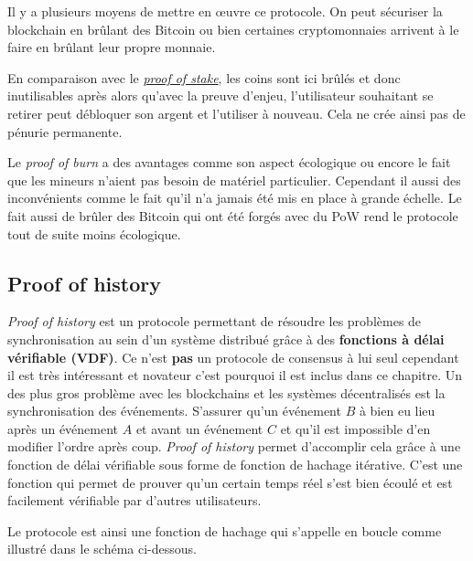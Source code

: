 Il y a plusieurs moyens de mettre en œuvre ce protocole. On peut sécuriser la blockchain en brûlant des Bitcoin ou bien certaines cryptomonnaies arrivent à le faire en brûlant leur propre monnaie.

En comparaison avec le \hyperref[consensus:pos]{\emph{proof of stake}}, les coins sont ici brûlés et donc inutilisables après alors qu'avec la preuve d'enjeu, l'utilisateur souhaitant se retirer peut débloquer son argent et l'utiliser à nouveau. Cela ne crée ainsi pas de pénurie permanente.

Le \emph{proof of burn} a des avantages comme son aspect écologique ou encore le fait que les mineurs n'aient pas besoin de matériel particulier. Cependant il aussi des inconvénients comme le fait qu'il n'a jamais été mis en place à grande échelle. Le fait aussi de brûler des Bitcoin qui ont été forgés avec du PoW rend le protocole tout de suite moins écologique.

\newpage

\subsection{Proof of history}

\emph{Proof of history} \cite{proof:poh} est un protocole permettant de résoudre les problèmes de synchronisation au sein d'un système distribué grâce à des \textbf{fonctions à délai vérifiable (VDF)}. Ce n'est \textbf{pas} un protocole de consensus à lui seul cependant il est très intéressant et novateur c'est pourquoi il est inclus dans ce chapitre. Un des plus gros problème avec les blockchains et les systèmes décentralisés est la synchronisation des événements. S'assurer qu'un événement $B$ à bien eu lieu après un événement $A$ et avant un événement $C$ et qu'il est impossible d'en modifier l'ordre après coup. \emph{Proof of history} permet d'accomplir cela grâce à une fonction de délai vérifiable sous forme de fonction de hachage itérative. C'est une fonction qui permet de prouver qu'un certain temps réel s'est bien écoulé et est facilement vérifiable par d'autres utilisateurs.

Le protocole est ainsi une fonction de hachage qui s'appelle en boucle comme illustré dans le schéma ci-dessous.

